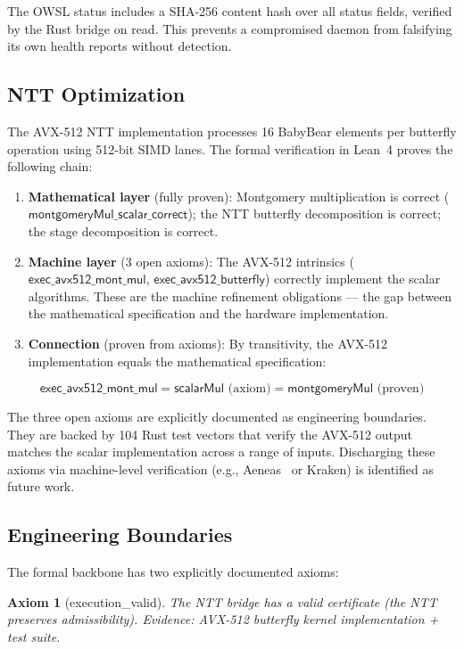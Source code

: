 \documentclass[11pt,a4paper]{article}
\newtheorem{axiom}{Axiom}
\begin{document}
The OWSL status includes a SHA-256 content hash over all status fields, verified by the Rust bridge on read. This prevents a compromised daemon from falsifying its own health reports without detection.

\subsection{NTT Optimization}
\label{sec:ntt}

The AVX-512 NTT implementation processes 16 BabyBear elements per butterfly operation using 512-bit SIMD lanes. The formal verification in Lean~4 proves the following chain:

\begin{enumerate}
\item \textbf{Mathematical layer} (fully proven): Montgomery multiplication is correct ($\textsf{montgomeryMul\_scalar\_correct}$); the NTT butterfly decomposition is correct; the stage decomposition is correct.
\item \textbf{Machine layer} (3 open axioms): The AVX-512 intrinsics ($\textsf{exec\_avx512\_mont\_mul}$, $\textsf{exec\_avx512\_butterfly}$) correctly implement the scalar algorithms. These are the machine refinement obligations --- the gap between the mathematical specification and the hardware implementation.
\item \textbf{Connection} (proven from axioms): By transitivity, the AVX-512 implementation equals the mathematical specification:
\end{enumerate}

$$\textsf{exec\_avx512\_mont\_mul} = \textsf{scalarMul} \text{ (axiom)} = \textsf{montgomeryMul} \text{ (proven)}$$

The three open axioms are explicitly documented as engineering boundaries. They are backed by 104 Rust test vectors that verify the AVX-512 output matches the scalar implementation across a range of inputs. Discharging these axioms via machine-level verification (e.g., Aeneas~\cite{aeneas} or Kraken) is identified as future work.

\subsection{Engineering Boundaries}
\label{sec:boundaries}

The formal backbone has two explicitly documented axioms:

\begin{axiom}[execution\_valid]
The NTT bridge has a valid certificate (the NTT preserves admissibility). Evidence: AVX-512 butterfly kernel implementation + test suite.
\end{axiom}
\end{document}
